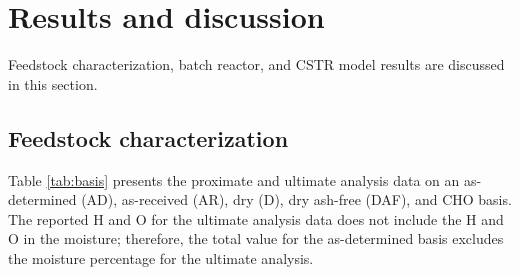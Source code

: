 
\section{Results and discussion}

Feedstock characterization, batch reactor, and CSTR model results are discussed in this section.

\subsection{Feedstock characterization}

Table \ref{tab:basis} presents the proximate and ultimate analysis data on an as-determined (AD), as-received (AR), dry (D), dry ash-free (DAF), and CHO basis. The reported H and O for the ultimate analysis data does not include the H and O in the moisture; therefore, the total value for the as-determined basis excludes the moisture percentage for the ultimate analysis.

